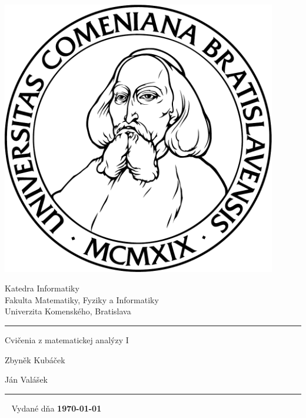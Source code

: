 \thispagestyle{empty}
\begin{minipage}{0.25\textwidth}
  \includegraphics[width=0.9\textwidth]{img/komlogo-new}
\end{minipage}
\begin{minipage}{0.69\textwidth}
  \begin{center}
    \sc Katedra Informatiky \\
    Fakulta Matematiky, Fyziky a Informatiky \\
    Univerzita Komenského, Bratislava
  \end{center}
\end{minipage}
\vfill
\begin{center}
  \begin{minipage}{0.8\textwidth}
    \hrule
    \bigskip\bigskip
    \centerline{\LARGE\sc Cvičenia z matematickej analýzy I}
    \bigskip\bigskip
    \centerline{\large\sc Zbyněk Kubáček}
    \bigskip
    \centerline{\large\sc Ján Valášek}
    \bigskip\bigskip
    \hrule
  \end{minipage}
\end{center}
\vfill
{~}
\hfill Vydané dňa {\bf\today}
\eject %
